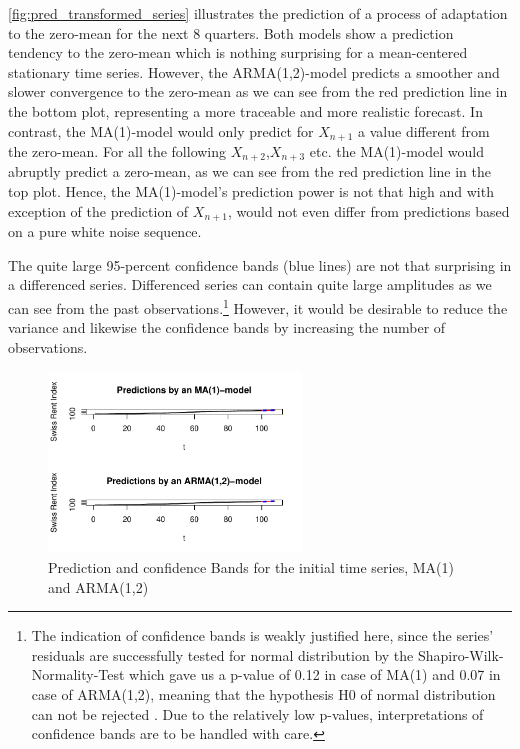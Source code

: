 \documentclass[11pt,a4paper]{article}
\begin{document}
\cref{fig:pred_transformed_series} illustrates the prediction of a process of adaptation to the zero-mean for the next 8 quarters.
Both models show a prediction tendency to the zero-mean which is nothing surprising for a mean-centered stationary time series.
However, the ARMA(1,2)-model predicts a smoother and slower convergence to the zero-mean as we can see from the red prediction line in the bottom plot, representing a more traceable and more realistic forecast.
In contrast, the MA(1)-model would only predict for $X_{n+1}$ a value different from the zero-mean.
For all the following $X_{n+2}$,$X_{n+3}$ etc. the MA(1)-model would abruptly predict a zero-mean, as we can see from the red prediction line in the top plot.
Hence, the MA(1)-model's prediction power is not that high and with exception of the prediction of $X_{n+1}$, would not even differ from predictions based on a pure white noise sequence.

The quite large 95-percent confidence bands (blue lines) are not that surprising in a differenced series.
Differenced series can contain quite large amplitudes as we can see from the past observations.\footnote{
    The indication of confidence bands is weakly justified here, since the series’ residuals are successfully tested for normal distribution by the Shapiro-Wilk-Normality-Test which gave us a p-value of 0.12 in case of MA(1) and 0.07 in case of ARMA(1,2), meaning that the hypothesis H0 of normal distribution can not be rejected \citep{shapiro}.
    Due to the relatively low p-values, interpretations of confidence bands are to be handled with care.
}
However, it would be desirable to reduce the variance and likewise the confidence bands by increasing the number of observations.
\begin{figure}
    \centering
    \includegraphics[width=0.6\textwidth]{pred_initial_series}
    \caption{Prediction and confidence Bands for the initial time series, MA(1) and ARMA(1,2)}
    \label{fig:pred_initial_series}
\end{figure}
\end{document}
